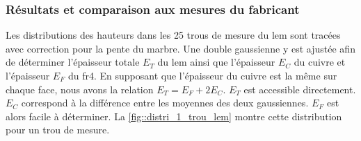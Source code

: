                     
                    
            \subsubsection{Résultats et comparaison aux mesures du fabricant}
                
                Les distributions des hauteurs dans les 25 trous de mesure du \gls{lem} sont tracées avec correction pour la pente du marbre. Une double gaussienne y est ajustée afin de déterminer l'épaisseur totale $E_T$ du \gls{lem} ainsi que l'épaisseur $E_C$ du cuivre et l'épaisseur $E_F$ du \gls{fr4}. En supposant que l'épaisseur du cuivre est la même sur chaque face, nous avons la relation $E_T = E_F + 2E_C$. $E_T$ est accessible directement. $E_C$ correspond à la différence entre les moyennes des deux gaussiennes. $E_F$ est alors facile à déterminer. La \autoref{fig::distri_1_trou_lem} montre cette distribution pour un trou de mesure. 
                
